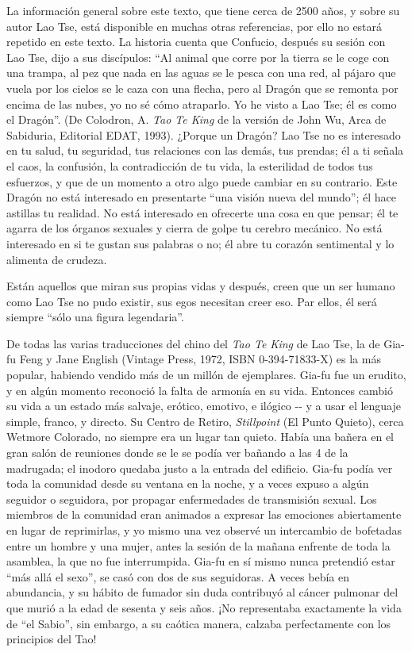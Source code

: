 La información general sobre este texto, que tiene cerca de 2500 años, y
sobre su autor Lao Tse, está disponible en muchas otras referencias, por
ello no estará repetido en este texto. La historia cuenta que Confucio,
después su sesión con Lao Tse, dijo a sus discípulos: ``Al animal que
corre por la tierra se le coge con una trampa, al pez que nada en las
aguas se le pesca con una red, al pájaro que vuela por los cielos se le
caza con una flecha, pero al Dragón que se remonta por encima de las
nubes, yo no sé cómo atraparlo. Yo he visto a Lao Tse; él es como el
Dragón''. (De Colodron, A. \emph{Tao Te King} de la versión de John Wu,
Arca de Sabiduria, Editorial EDAT, 1993). ¿Porque un Dragón? Lao Tse no
es interesado en tu salud, tu seguridad, tus relaciones con las demás,
tus prendas; él a ti señala el caos, la confusión, la contradicción de
tu vida, la esterilidad de todos tus esfuerzos, y que de un momento a
otro algo puede cambiar en su contrario. Este Dragón no está interesado
en presentarte ``una visión nueva del mundo''; él hace astillas tu
realidad. No está interesado en ofrecerte una cosa en que pensar; él te
agarra de los órganos sexuales y cierra de golpe tu cerebro mecánico. No
está interesado en si te gustan sus palabras o no; él abre tu corazón
sentimental y lo alimenta de crudeza.

Están aquellos que miran sus propias vidas y después, creen que un ser
humano como Lao Tse no pudo existir, sus egos necesitan creer eso. Par
ellos, él será siempre ``sólo una figura legendaria''.

De todas las varias traducciones del chino del \emph{Tao Te King} de Lao
Tse, la de Gia-fu Feng y Jane English (Vintage Press, 1972, ISBN
0-394-71833-X) es la más popular, habiendo vendido más de un millón de
ejemplares. Gia-fu fue un erudito, y en algún momento reconoció la falta
de armonía en su vida. Entonces cambió su vida a un estado más salvaje,
erótico, emotivo, e ilógico -\/- y a usar el lenguaje simple, franco, y
directo. Su Centro de Retiro, \emph{Stillpoint} (El Punto Quieto), cerca
Wetmore Colorado, no siempre era un lugar tan quieto. Había una bañera
en el gran salón de reuniones donde se le se podía ver bañando a las 4
de la madrugada; el inodoro quedaba justo a la entrada del edificio.
Gia-fu podía ver toda la comunidad desde su ventana en la noche, y a
veces expuso a algún seguidor o seguidora, por propagar enfermedades de
transmisión sexual. Los miembros de la comunidad eran animados a
expresar las emociones abiertamente en lugar de reprimirlas, y yo mismo
una vez observé un intercambio de bofetadas entre un hombre y una mujer,
antes la sesión de la mañana enfrente de toda la asamblea, la que no fue
interrumpida. Gia-fu en sí mismo nunca pretendió estar ``más allá el
sexo'', se casó con dos de sus seguidoras. A veces bebía en abundancia,
y su hábito de fumador sin duda contribuyó al cáncer pulmonar del que
murió a la edad de sesenta y seis años. ¡No representaba exactamente la
vida de ``el Sabio'', sin embargo, a su caótica manera, calzaba
perfectamente con los principios del Tao!

